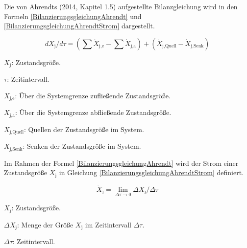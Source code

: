 Die von Ahrendts (2014, Kapitel 1.5) aufgestellte Bilanzgleichung wird in den Formeln \eqref{BilanzierungsgleichungAhrendt} und 
\eqref{BilanzierungsgleichungAhrendtStrom} dargestellt.

\begin{equation}
    dX_{\text{j}}/d\tau = (\sum \dot{X}_{\text{j,e}} - \sum \dot{X}_{\text{j,a}}) + (\dot{X}_{\text{j,Quell}} - \dot{X}_{\text{j,Senk}})
    \label{BilanzierungsgleichungAhrendt}
\end{equation}

\begin{description}
    \item \(X_{\text{j}}\): Zustandsgröße.
    \item \(\tau\): Zeitintervall.
    \item \(X_{\text{j,e}}\): Über die Systemgrenze zufließende Zustandsgröße.
    \item \(X_{\text{j,a}}\): Über die Systemgrenze abfließende Zustandsgröße.
    \item \(X_{\text{j,Quell}}\): Quellen der Zustandsgröße im System.
    \item \(X_{\text{j,Senk}}\): Senken der Zustandsgröße im System.
\end{description}

Im Rahmen der Formel \eqref{BilanzierungsgleichungAhrendt} wird der Strom einer Zustandsgröße \(X_{\text{j}}\) in Gleichung 
\eqref{BilanzierungsgleichungAhrendtStrom} definiert.

\begin{equation}
    \dot{X}_{\text{j}} = \lim_{\Delta\tau \to 0} \Delta X_{\text{j}}/ \Delta\tau
    \label{BilanzierungsgleichungAhrendtStrom}
\end{equation}

\begin{description}
    \item \(X_{\text{j}}\): Zustandsgröße.
    \item \(\Delta X_{\text{j}}\): Menge der Größe \(X_{\text{j}}\) im Zeitintervall \(\Delta \tau\).
    \item \(\Delta \tau\): Zeitintervall.
\end{description}

